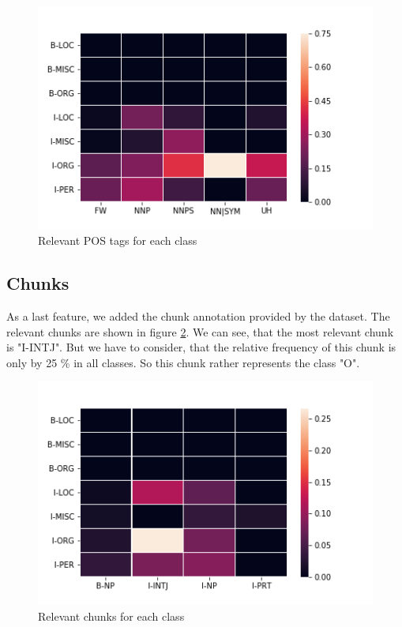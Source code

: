 \documentclass[noindent, nochapname]{tudexercise}
\begin{document}
			\begin{figure}[h]
				\centering
				\includegraphics[scale=0.6]{img/pos_per_class.png}
				\caption{Relevant POS tags for each class}
				\label{fig:pos_per_class}
			\end{figure}
		
		\subsection{Chunks}
			As a last feature, we added the chunk annotation provided by the dataset. The relevant chunks are shown in figure \ref{fig:chunks_per_class}. We can see, that the most relevant chunk is "I-INTJ". But we have to consider, that the relative frequency of this chunk is only by 25 \% in all classes. So this chunk rather represents the class "O". 
			
			\begin{figure}[h]
				\centering
				\includegraphics[scale=0.6]{img/chunks_per_class.png}
				\caption{Relevant chunks for each class}
				\label{fig:chunks_per_class}
			\end{figure}
			\newpage
	
\end{document}
